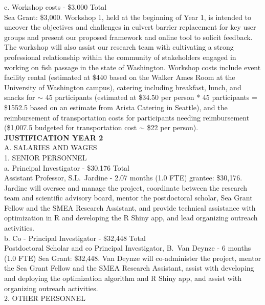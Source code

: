 \documentclass[12pt]{elsarticle}
\begin{document}
c. Workshop costs - \$3,000 Total\\
Sea Grant: \$3,000. Workshop 1, held at the beginning of Year 1, is intended to uncover the objectives and challenges in culvert barrier replacement for key user groups and present our proposed framework and online tool to solicit feedback. The workshop will also assist our research team with cultivating a strong professional relationship within the community of stakeholders engaged in working on fish passage in the state of Washington. Workshop costs include event facility rental (estimated at \$440 based on the Walker Ames Room at the University of Washington campus), catering including breakfast, lunch, and snacks for $\sim$ 45 participants (estimated at \$34.50 per person * 45 participants = \$1552.5 based on an estimate from Arista Catering in Seattle), and the reimbursement of transportation costs for participants needing reimbursement (\$1,007.5 budgeted for transportation cost $\sim$ \$22 per person). \\

\noindent \textbf{JUSTIFICATION YEAR 2}\\

A. SALARIES AND WAGES\\

1. SENIOR PERSONNEL\\

a. Principal Investigator - \$30,176 Total\\

Assistant Professor, S.L.\ Jardine - 2.07 months (1.0 FTE) grantee: \$30,176. Jardine will oversee and manage the project, coordinate between the research team and scientific advisory board, mentor the postdoctoral scholar, Sea Grant Fellow and the SMEA Research Assistant, and provide technical assistance with optimization in R and developing the R Shiny app, and lead organizing outreach activities.\\

b. Co - Principal Investigator - \$32,448 Total\\

Postdoctoral Scholar and co Principal Investigator, B.\ Van Deynze - 6 months (1.0 FTE) Sea Grant: \$32,448. Van Deynze will co-administer the project, mentor the Sea Grant Fellow and the SMEA Research Assistant, assist with developing and deploying the optimization algorithm and R Shiny app, and assist with organizing outreach activities.\\


2. OTHER PERSONNEL\\
\end{document}
